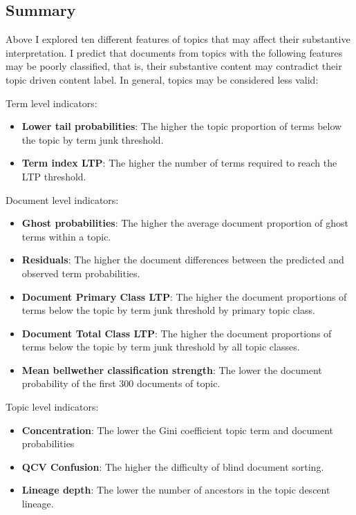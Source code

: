 \documentclass[]{book}
\providecommand{\tightlist}{%
  \setlength{\itemsep}{0pt}\setlength{\parskip}{0pt}}
\theoremstyle{definition}
\theoremstyle{definition}
\theoremstyle{definition}
\theoremstyle{remark}
\begin{document}
\hypertarget{summary}{%
\subsection{Summary}\label{summary}}

Above I explored ten different features of topics that may affect their
substantive interpretation. I predict that documents from topics with
the following features may be poorly classified, that is, their
substantive content may contradict their topic driven content label. In
general, topics may be considered less valid:

Term level indicators:

\begin{itemize}
\tightlist
\item
  \textbf{Lower tail probabilities}: The higher the topic proportion of
  terms below the topic by term junk threshold.
\item
  \textbf{Term index LTP}: The higher the number of terms required to
  reach the LTP threshold.
\end{itemize}

Document level indicators:

\begin{itemize}
\tightlist
\item
  \textbf{Ghost probabilities}: The higher the average document
  proportion of ghost terms within a topic.
\item
  \textbf{Residuals}: The higher the document differences between the
  predicted and observed term probabilities.
\item
  \textbf{Document Primary Class LTP}: The higher the document
  proportions of terms below the topic by term junk threshold by primary
  topic class.
\item
  \textbf{Document Total Class LTP}: The higher the document proportions
  of terms below the topic by term junk threshold by all topic classes.
\item
  \textbf{Mean bellwether classification strength}: The lower the
  document probability of the first 300 documents of topic.
\end{itemize}

Topic level indicators:

\begin{itemize}
\tightlist
\item
  \textbf{Concentration}: The lower the Gini coefficient topic term and
  document probabilities
\item
  \textbf{QCV Confusion}: The higher the difficulty of blind document
  sorting.
\item
  \textbf{Lineage depth}: The lower the number of ancestors in the topic
  descent lineage.
\end{itemize}
\end{document}
